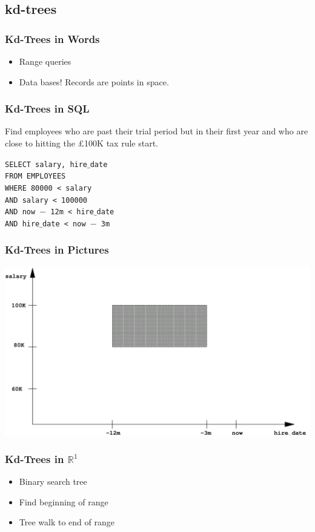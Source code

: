 \documentclass{beamer}
\begin{document}
\subsection{kd-trees}

\begin{frame}
  \frametitle{Kd-Trees in Words}
  \begin{itemize}
  \item Range queries
    \pause
  \item Data bases!  Records are points in space.
  \end{itemize}
\end{frame}

\begin{frame}
  \frametitle{Kd-Trees in SQL}

  Find employees who are past their trial period but in their first
  year and who are close to hitting the \pounds 100K tax rule start.

  \bigskip

  \texttt{SELECT salary, hire$\_$date\\
  FROM EMPLOYEES\\
  WHERE 80000 < salary \\
  \hspace{5mm}AND salary < 100000\\
  AND now $-$ 12m < hire$\_$date \\
  \hspace{5mm}AND hire$\_$date < now $-$ 3m}
\end{frame}

\begin{frame}
  \frametitle{Kd-Trees in Pictures}

  \includegraphics[width=\textwidth]{kd-SQL.pdf}
\end{frame}

\begin{frame}
  \frametitle{Kd-Trees in $\mathbb{R}^1$}
  
  \begin{itemize}
  \item Binary search tree
  \item Find beginning of range
  \item Tree walk to end of range
  \end{itemize}
\end{frame}
\end{document}
